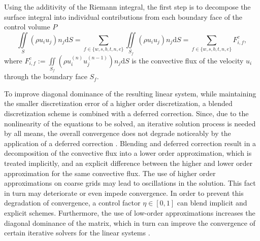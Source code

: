 Using the additivity of the Riemann integral, the first step is to decompose the surface integral into individual contributions from each boundary face of the control volume \(P\)
\begin{displaymath}
  \iint\limits_S \left(\rho u_i u_j \right) n_j \mathrm{d}S
  = \sum_{f \in \{w,s,b,t,n,e\}} \iint\limits_{S_f} \left(\rho u_{i} u_{j}\right) n_{j} \mathrm{d}S
  = \sum_{f \in \{w,s,b,t,n,e\}} F_{i,f}^{c},
\end{displaymath}
where \(\textstyle F_{i,f}^c := \iint\limits_{S_f} \left(\rho u_{i}^{(n)} u_{j}^{(n-1)}\right) n_{j} \mathrm{d}S \) is the convective flux of the velocity \(u_i\) through the boundary face \(S_f\). 
      
To improve diagonal dominance of the resulting linear system, while maintaining the smaller discretization error of a higher order discretization, a blended discretization scheme is combined with a deferred correction. Since, due to the nonlinearity of the equations to be solved, an iterative solution process is needed by all means, the overall convergence does not degrade noticeably by the application of a deferred correction \cite{ferziger02}. Blending and deferred correction result in a decomposition of the convective flux into a lower order approximation, which is treated implicitly, and an explicit difference between the higher and lower order approximation for the same convective flux. The use of higher order approximations on coarse grids may lead to oscillations in the solution. This fact in turn may deteriorate or even impede convergence. In order to prevent this degradation of convergence, a control factor \( \eta \in [0,1]\) can blend implicit and explicit schemes. Furthermore, the use of low-order approximations increases the diagonal dominance of the matrix, which in turn can improve the convergence of certain iterative solvers for the linear systems \cite{schaefer99}.

